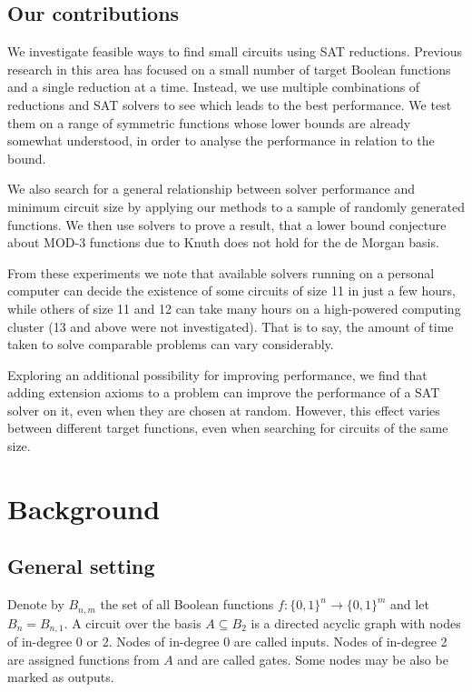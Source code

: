 \documentclass{article}
\begin{document}
\subsection{Our contributions}

We investigate feasible ways to find small circuits using SAT reductions. Previous research in this area has focused on a small number of target Boolean functions and a single reduction at a time. Instead, we use multiple combinations of reductions and SAT solvers to see which leads to the best performance. We test them on a range of symmetric functions whose lower bounds are already somewhat understood, in order to analyse the performance in relation to the bound. 

We also search for a general relationship between solver performance and minimum circuit size by applying our methods to a sample of randomly generated functions. We then use solvers to prove a result, that a lower bound conjecture about MOD-3 functions due to Knuth\cite{knuth15} does not hold for the de Morgan basis. 

From these experiments we note that available solvers running on a personal computer can decide the existence of some circuits of size 11 in just a few hours, while others of size 11 and 12 can take many hours on a high-powered computing cluster (13 and above were not investigated). That is to say, the amount of time taken to solve comparable problems can vary considerably.

Exploring an additional possibility for improving performance, we find that adding extension axioms to a problem can improve the performance of a SAT solver on it, even when they are chosen at random. However, this effect varies between different target functions, even when searching for circuits of the same size.

\section{Background}

\subsection{General setting}

Denote by \(B_{n,m}\) the set of all Boolean functions \(f: \{0,1\}^n \to \{0,1\}^m\) and let \(B_n = B_{n,1}\). A circuit over the basis \(A \subseteq B_2\) is a directed acyclic graph with nodes of in-degree 0 or 2. Nodes of in-degree 0 are called inputs. Nodes of in-degree 2 are assigned functions from \(A\) and are called gates. Some nodes may be also be marked as outputs.
\end{document}
